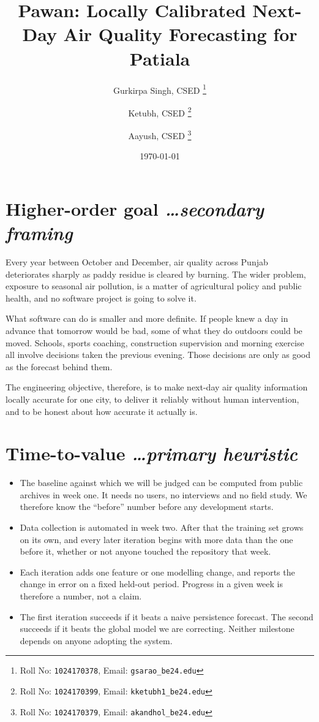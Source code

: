 \documentclass[11pt,a4paper]{article}
\title{Pawan: Locally Calibrated Next-Day Air Quality
  Forecasting for Patiala}
\author{
  Gurkirpa Singh, CSED%
  \thanks{Roll No: \texttt{1024170378}, %
    Email: \texttt{gsarao\_be24\@thapar.edu}}
  \and
  Ketubh, CSED%
  \thanks{Roll No: \texttt{1024170399}, %
    Email: \texttt{kketubh1\_be24\@thapar.edu}}
  \and
  Aayush, CSED%
  \thanks{Roll No: \texttt{1024170379}, %
    Email: \texttt{akandhol\_be24\@thapar.edu}}
}
\date{\today}
\newcommand{\BvrHint}[1]{%
  {\normalfont\normalsize\itshape\hfill #1}}
\begin{document}
\maketitle

\section{Higher-order goal%
  \BvrHint{\ldots secondary framing}}
Every year between October and December, air quality
across Punjab deteriorates sharply as paddy residue is
cleared by burning. The wider problem, exposure to
seasonal air pollution, is a matter of agricultural
policy and public health, and no software project is
going to solve it.

What software can do is smaller and more definite. If
people knew a day in advance that tomorrow would be
bad, some of what they do outdoors could be moved.
Schools, sports coaching, construction supervision and
morning exercise all involve decisions taken the
previous evening. Those decisions are only as good as
the forecast behind them.

The engineering objective, therefore, is to make
next-day air quality information locally accurate for
one city, to deliver it reliably without human
intervention, and to be honest about how accurate it
actually is.

\section{Time-to-value %
\BvrHint{\ldots primary heuristic}}
\begin{itemize}[leftmargin=0.7cm]
  \item The baseline against which we will be judged can
    be computed from public archives in week one. It
    needs no users, no interviews and no field study. We
    therefore know the ``before'' number before any
    development starts.
  \item Data collection is automated in week two. After
    that the training set grows on its own, and every
    later iteration begins with more data than the one
    before it, whether or not anyone touched the
    repository that week.
  \item Each iteration adds one feature or one modelling
    change, and reports the change in error on a fixed
    held-out period. Progress in a given week is
    therefore a number, not a claim.
  \item The first iteration succeeds if it beats a naive
    persistence forecast. The second succeeds if it
    beats the global model we are correcting. Neither
    milestone depends on anyone adopting the system.
\end{itemize}
\end{document}
